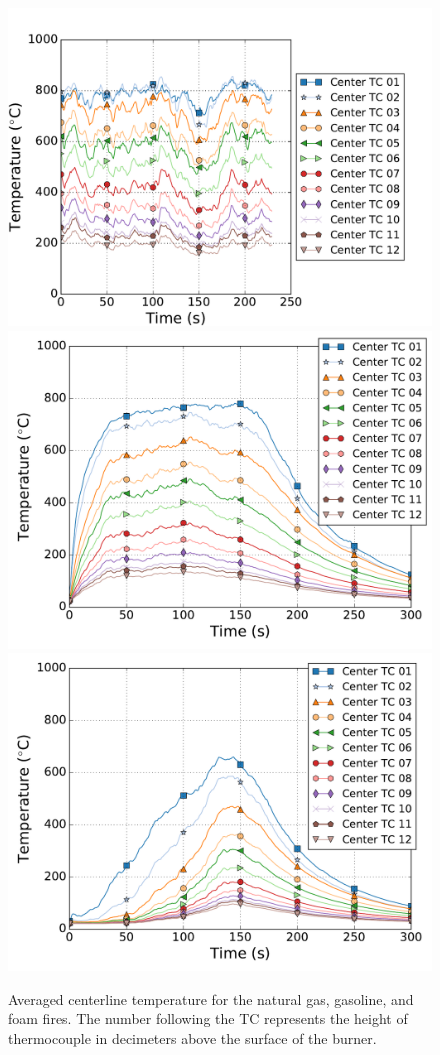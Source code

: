 \documentclass[twoside]{uocthesis}
\begin{document}
{\begin{figure}[p]
  \centering
  \includegraphics[width=.625\columnwidth]{../Figures/FHNG_TC_Plume_Avg}\\
  \includegraphics[width=.625\columnwidth]{../Figures/FHGAS_TC_Plume_Avg}\\
  \includegraphics[width=.625\columnwidth]{../Figures/FHPUF_TC_Plume_Avg}\\
  \caption[Averaged centerline temperature for the natural gas, gasoline, and foam fires]{Averaged centerline temperature for the natural gas, gasoline, and foam fires. The number following the TC represents the height of thermocouple in decimeters above the surface of the burner.}
  \label{Temp}
\end{figure}

}
\end{document}
